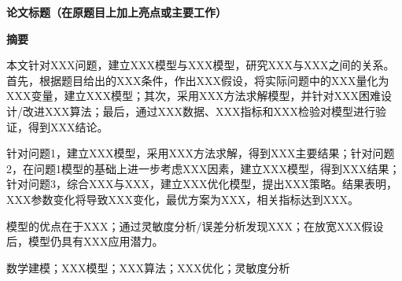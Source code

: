 \documentclass[12pt,a4paper]{article}
\newcommand{\tip}[1]{\par\noindent\textbf{【提示】} #1\par}
\begin{document}
\setcounter{page}{1}

\begin{center}
{\bfseries 论文标题（在原题目上加上亮点或主要工作）}

\vspace{2ex}
{\bfseries 摘要}
\end{center}

本文针对XXX问题，建立XXX模型与XXX模型，研究XXX与XXX之间的关系。首先，根据题目给出的XXX条件，作出XXX假设，将实际问题中的XXX量化为XXX变量，建立XXX模型；其次，采用XXX方法求解模型，并针对XXX困难设计/改进XXX算法；最后，通过XXX数据、XXX指标和XXX检验对模型进行验证，得到XXX结论。

针对问题1，建立XXX模型，采用XXX方法求解，得到XXX主要结果；针对问题2，在问题1模型的基础上进一步考虑XXX因素，建立XXX模型，得到XXX结果；针对问题3，综合XXX与XXX，建立XXX优化模型，提出XXX策略。结果表明，XXX参数变化将导致XXX变化，最优方案为XXX，相关指标达到XXX。

模型的优点在于XXX；通过灵敏度分析/误差分析发现XXX；在放宽XXX假设后，模型仍具有XXX应用潜力。

\vspace{2ex}
 数学建模；XXX模型；XXX算法；XXX优化；灵敏度分析

\vspace{2ex}


\end{document}
